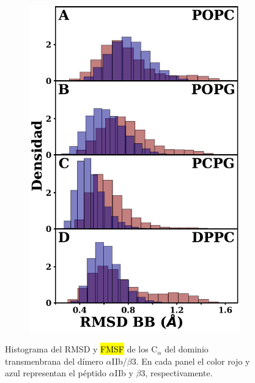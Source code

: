 \begin{figure}[H]
\begin{subfigure}[t]{0.45\textwidth}
        \includegraphics[width=1\linewidth, height=0.99\textheight, keepaspectratio]{fig/02_dm/rmsd_all.pdf}     
    \end{subfigure}
    
\caption[Histograma del RMSD  y \hl{FMSF} de los C$_\alpha$ del dominio transmenbrana $\alpha$IIb/$\beta$3]{Histograma del RMSD  y \hl{FMSF} de los C$_\alpha$ del dominio transmenbrana del dímero $\alpha$IIb/$\beta$3. En cada panel el color rojo y azul representan el péptido $\alpha$IIb y $\beta$3, respectivamente.}
    \label{fig:rmsdf}
\end{figure}


